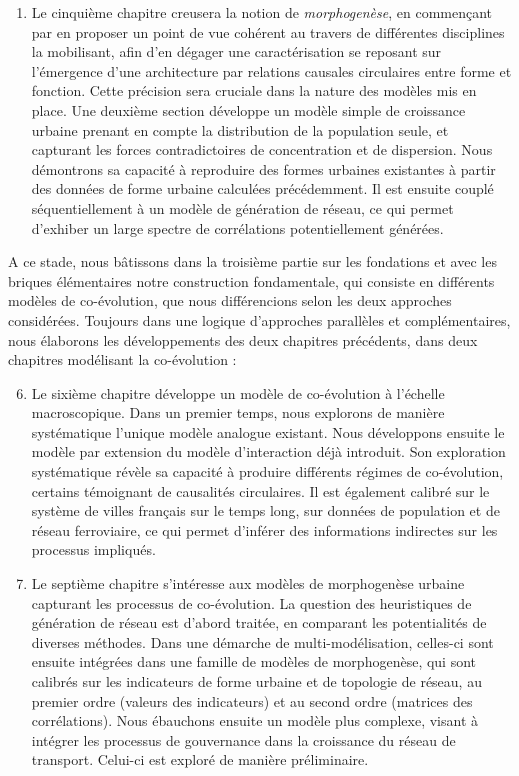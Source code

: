 {\begin{enumerate}
	\item Le cinquième chapitre creusera la notion de \emph{morphogenèse}, en commençant par en proposer un point de vue cohérent au travers de différentes disciplines la mobilisant, afin d'en dégager une caractérisation se reposant sur l'émergence d'une architecture par relations causales circulaires entre forme et fonction. Cette précision sera cruciale dans la nature des modèles mis en place. Une deuxième section développe un modèle simple de croissance urbaine prenant en compte la distribution de la population seule, et capturant les forces contradictoires de concentration et de dispersion. Nous démontrons sa capacité à reproduire des formes urbaines existantes à partir des données de forme urbaine calculées précédemment. Il est ensuite couplé séquentiellement à un modèle de génération de réseau, ce qui permet d'exhiber un large spectre de corrélations potentiellement générées.
\end{enumerate}
A ce stade, nous bâtissons dans la troisième partie sur les fondations et avec les briques élémentaires notre construction fondamentale, qui consiste en différents modèles de co-évolution, que nous différencions selon les deux approches considérées. Toujours dans une logique d'approches parallèles et complémentaires, nous élaborons les développements des deux chapitres précédents, dans deux chapitres modélisant la co-évolution :
\begin{enumerate}\setcounter{enumi}{5}
	\item Le sixième chapitre développe un modèle de co-évolution à l'échelle macroscopique. Dans un premier temps, nous explorons de manière systématique l'unique modèle analogue existant. Nous développons ensuite le modèle par extension du modèle d'interaction déjà introduit. Son exploration systématique révèle sa capacité à produire différents régimes de co-évolution, certains témoignant de causalités circulaires. Il est également calibré sur le système de villes français sur le temps long, sur données de population et de réseau ferroviaire, ce qui permet d'inférer des informations indirectes sur les processus impliqués.
	\item Le septième chapitre s'intéresse aux modèles de morphogenèse urbaine capturant les processus de co-évolution. La question des heuristiques de génération de réseau est d'abord traitée, en comparant les potentialités de diverses méthodes. Dans une démarche de multi-modélisation, celles-ci sont ensuite intégrées dans une famille de modèles de morphogenèse, qui sont calibrés sur les indicateurs de forme urbaine et de topologie de réseau, au premier ordre (valeurs des indicateurs) et au second ordre (matrices des corrélations). Nous ébauchons ensuite un modèle plus complexe, visant à intégrer les processus de gouvernance dans la croissance du réseau de transport. Celui-ci est exploré de manière préliminaire.

\end{enumerate}}
